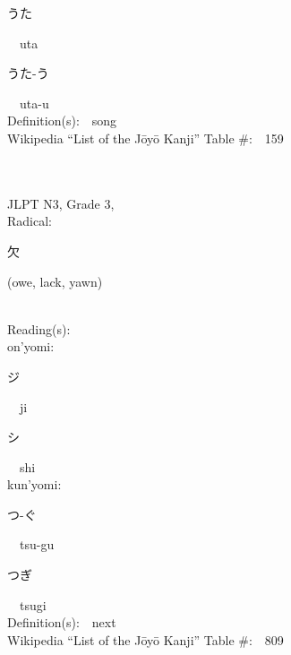 \begin{multicols}{2}
{\hspace*{2em}}{\begin{CJK}{UTF8}{min} うた \end{CJK}}\ \ uta\ \ \\
{\hspace*{2em}}{\begin{CJK}{UTF8}{min} うた-う \end{CJK}}\ \ uta-u\ \ \\
Definition(s):\ \ song \\
Wikipedia ``List of the J\=oy\=o Kanji'' Table \#:\ \ 159 \\
\ \ \\
{\fontsize{34pt}{40pt}  }\ \ \\  %
{JLPT N3, Grade 3, \\Radical:\ \ {\begin{CJK}{UTF8}{min} 欠 \end{CJK}} (owe, lack, yawn) } \\
Reading(s):\ \ \\
{\hspace*{1em}}on'yomi:\ \ \\
{\hspace*{2em}}{\begin{CJK}{UTF8}{min} ジ \end{CJK}}\ \ ji\ \ \\
{\hspace*{2em}}{\begin{CJK}{UTF8}{min} シ \end{CJK}}\ \ shi\ \ \\
{\hspace*{1em}}kun'yomi:\ \ \\
{\hspace*{2em}}{\begin{CJK}{UTF8}{min} つ-ぐ \end{CJK}}\ \ tsu-gu\ \ \\
{\hspace*{2em}}{\begin{CJK}{UTF8}{min} つぎ \end{CJK}}\ \ tsugi\ \ \\
Definition(s):\ \ next \\
Wikipedia ``List of the J\=oy\=o Kanji'' Table \#:\ \ 809 \\
\ \ \\

\end{multicols}
